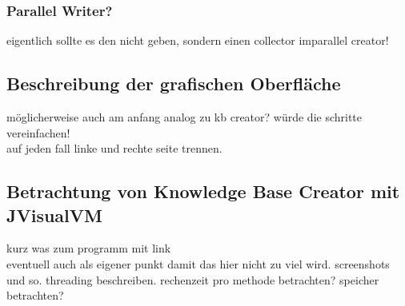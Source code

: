 \documentclass[12pt,a4paper]{article}
\begin{document}
\subsubsection{Parallel Writer?}
eigentlich sollte es den nicht geben, sondern einen collector imparallel creator!
\subsection{Beschreibung der grafischen Oberfläche}
möglicherweise auch am anfang analog zu kb creator? würde die schritte vereinfachen! \\
auf jeden fall linke und rechte seite trennen.
\subsection{Betrachtung von Knowledge Base Creator mit JVisualVM}
kurz was zum programm mit link \\
eventuell auch als eigener punkt damit das hier nicht zu viel wird. screenshots und so. threading beschreiben. rechenzeit pro methode betrachten? speicher betrachten?



\newpage

 
\end{document}
